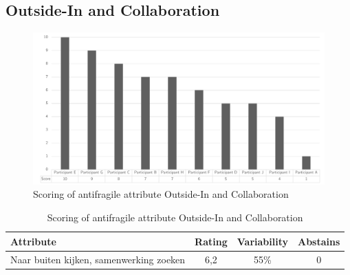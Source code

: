\subsection{Outside-In and Collaboration}
\begin{figure}[H]
	\centering
	\includegraphics[width=0.9\linewidth]{images/scoreafnaarbuitenkijken}
	\caption[Scoring of antifragile attribute Outside-In and Collaboration]{Scoring of antifragile attribute Outside-In and Collaboration}
	\label{fig:appscoringafnaarbuiten}
\end{figure}
\begin{table}[H]
	\centering
	\begin{tabular}{p{}ccc}
		\toprule
		\textbf{Attribute} & \textbf{Rating} & \textbf{Variability} & \textbf{Abstains} \\
		\midrule
		Naar buiten kijken, samenwerking zoeken & 6,2 & 55\% & 0 \\%
		\bottomrule
	\end{tabular}%
	\caption[Scoring of antifragile attribute Outside-In and Collaboration]{Scoring of antifragile attribute Outside-In and Collaboration}
	\label{tab:appscoringafnaarbuitenkijken}%
\end{table}%
\newpage
